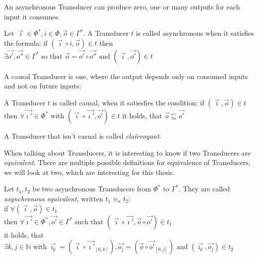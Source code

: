 An asynchronous Transducer can produce zero, one or many outputs for each input it consumes.

\begin{definition}[name = Asynchronous Transducer]\label{def:asynchronous_transducer}
  Let \(\vec{\imath}\in \Phi^*, i \in \Phi,\vec{o} \in \Gamma^*\).
  A Transducer \(t\) is called asynchronous when it satisfies the formula:
  if \((\vec{\imath}\circ i, \vec{o}) \in t \)
  then \(\exists \vec{o'},\vec{o''} \in \Gamma^*\text{ so that } \vec{o} = \vec{o'}\circ\vec{o''} \text{ and } (\vec{\imath},\vec{o'}) \in t \)
\end{definition}

A causal Transducer is one, where the output depends only on consumed inputs and not on future inputs:

\begin{definition}[name = Causal Transducer]\label{def:causal_transducer}
  A Transducer \(t\) is called causal, when it satiesfies the condition:
  if \((\vec{\imath},\vec{o}) \in t \)
  then \( \forall \vec{\imath'} \in \Phi^* \text{ with } (\vec{\imath} \circ \vec{\imath'}, \vec{o'}) \in t \)
  it holds, that \( \vec{o} \sqsubseteq \vec{o'} \)
\end{definition}

A Transducer that isn't casual is called \emph{clairvoyant}.

When talking about Transducers, it is interesting to know if two Transducers are \emph{equivalent}.
There are multiple possible definitions for equivalence of Transducers, we will look at two, which are interesting for this thesis.

\begin{definition}[name = Asynchronous equivalence of Transducers]\label{def:async_equivalence_transducer}
  Let \(t_1, t_2\) be two asynchronous Transducers from \(\Phi^*\) to \(\Gamma^*\).
  They are called \emph{asynchronous equivalent}, written \(t_1 \equiv_a t_2\): \\
  if \(\forall (\vec{\imath},\vec{o}) \in t_1\) \\
  then \( \forall \vec{\imath'} \in \Phi^*, \vec{o'} \in \Gamma^* \text{ such that } (\vec{\imath}\circ\vec{\imath'},\vec{o}\circ\vec{o'}) \in t_1\) \\
  it holds, that \( \exists k,j \in \mathbb{N} \text{ with  } \vec{\imath_k} = (\vec{\imath}\circ\vec{\imath'}_{[0,k]}),
  \vec{o_j} = (\vec{o}\circ\vec{o'}_{[0,j]}) \text{ and } (\vec{\imath_k}, \vec{o_j}) \in t_2\)
\end{definition}

